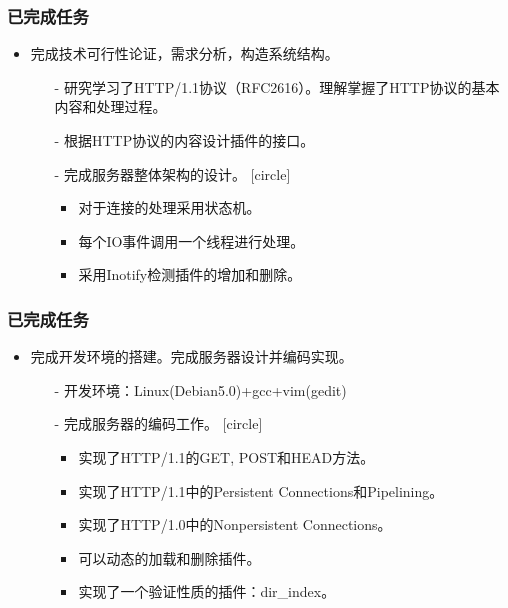 \documentclass[dvipdfm]{beamer}
\begin{document}
\begin{frame}
	\frametitle{已完成任务}
	\begin{itemize}
		\item 完成技术可行性论证，需求分析，构造系统结构。
		\pause
		\begin{itemize}
			\item[-] 研究学习了{\cp HTTP/1.1}协议（{\cp RFC2616}）。理解掌握了{\cp HTTP}协议的基本内容和处理过程。
			\item[-] 根据{\cp HTTP}协议的内容设计插件的接口。
			\item[-] 完成服务器整体架构的设计。
			\pause
			\begin{itemize}
					\item 对于连接的处理采用状态机。
					\item 每个{\cp IO}事件调用一个线程进行处理。
					\item 采用{\cp Inotify}检测插件的增加和删除。
			\end{itemize}
			
		\end{itemize}
	\end{itemize}
\end{frame}

\begin{frame}
	\frametitle{已完成任务}
	\begin{itemize}
		\item 完成开发环境的搭建。完成服务器设计并编码实现。
		\begin{itemize}
			\item[-] 开发环境：{\cp Linux(Debian5.0)+gcc+vim(gedit)}
			\item[-] 完成服务器的编码工作。
			\pause
			\begin{itemize}
					\item 实现了{\cp HTTP/1.1}的{\cp GET, POST}和{\cp HEAD}方法。
					\item 实现了{\cp HTTP/1.1}中的{\cp Persistent Connections}和{\cp Pipelining}。
					\item 实现了{\cp HTTP/1.0}中的{\cp Nonpersistent Connections}。
					\item 可以动态的加载和删除插件。
					\item 实现了一个验证性质的插件：{\cp dir\_index}。
			\end{itemize}
		\end{itemize}
	\end{itemize}
\end{frame}
\end{document}

